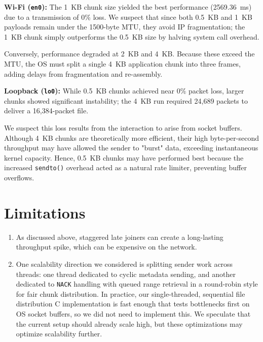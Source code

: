 \documentclass{article}
\begin{document}
\textbf{Wi-Fi (\texttt{en0}):}
The 1~KB chunk size yielded the best performance (2569.36~ms) due to a transmission of 0\% loss. We suspect that since both 0.5~KB and 1~KB payloads remain under the 1500-byte MTU, they avoid IP fragmentation; the 1~KB chunk simply outperforms the 0.5~KB size by halving system call overhead. 

Conversely, performance degraded at 2~KB and 4~KB. Because these exceed the MTU, the OS must split a single 4~KB application chunk into three frames, adding delays from fragmentation and re-assembly.

\textbf{Loopback (\texttt{lo0}):} While 0.5~KB chunks achieved near 0\% packet loss, larger chunks showed significant instability; the 4~KB run required 24,689 packets to deliver a 16,384-packet file. 

We suspect this loss results from the interaction to arise from socket buffers. Although 4~KB chunks are theoretically more efficient, their high byte-per-second throughput may have allowed the sender to "burst" data, exceeding instantaneous kernel capacity. Hence, 0.5~KB chunks may have performed best because the increased \texttt{sendto()} overhead acted as a natural rate limiter, preventing buffer overflows.

\section*{Limitations}

\begin{enumerate}
\item As discussed above, staggered late joiners can create a long-lasting throughput spike, which can be expensive on the network.

\item One scalability direction we considered is splitting sender work across threads: one thread dedicated to cyclic metadata sending, and another dedicated to \texttt{NACK} handling with queued range retrieval in a round-robin style for fair chunk distribution. In practice, our single-threaded, sequential file distribution C implementation is fast enough that tests bottlenecks first on OS socket buffers, so we did not need to implement this. We speculate that the current setup should already scale high, but these optimizations may optimize scalability further.
\end{enumerate}
\end{document}
